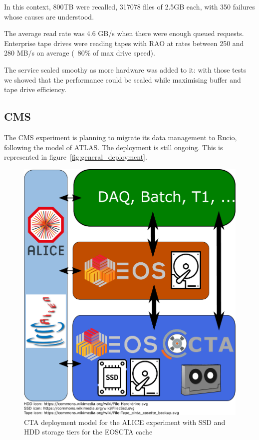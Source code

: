 \documentclass{webofc}
\begin{document}
In this context, 800TB were recalled, 317078 files of 2.5GB each, with 350 failures whose causes are understood.

The average read rate was 4.6 GB/s when there were enough queued requests. Enterprise tape drives were reading tapes with RAO at rates between 250 and 280 MB/s on average (~80\% of max drive speed).

The service scaled smoothy as more hardware was added to it: with those tests we showed that the performance could be scaled while maximising buffer and tape drive efficiency.

\subsection{CMS}

The CMS experiment is planning to migrate its data management to Rucio, following the model of ATLAS.
The deployment is still ongoing. This is represented in figure~\ref{fig:general_deployment}.

\begin{figure}
   \includegraphics[width=\linewidth]{images/withNewLogo/CTA_Deployment_ALICE}
   \caption{CTA deployment model for the ALICE experiment with SSD and HDD storage tiers for the EOSCTA cache}
   \label{fig:ALICE_deployment}
\end{figure}
\end{document}
